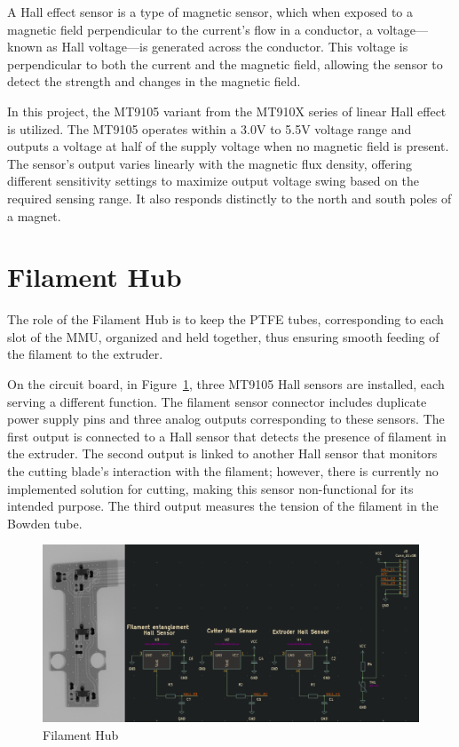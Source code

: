 A Hall effect sensor is a type of magnetic sensor, which when exposed to a magnetic field perpendicular to the current's flow in a conductor, a voltage—known as Hall voltage—is generated across the conductor. This voltage is perpendicular to both the current and the magnetic field, allowing the sensor to detect the strength and changes in the magnetic field.

In this project, the MT9105 variant \cite{hall-effect-sensor} from the MT910X series of linear Hall effect is utilized. The MT9105 operates within a 3.0V to 5.5V voltage range and outputs a voltage at half of the supply voltage when no magnetic field is present. The sensor's output varies linearly with the magnetic flux density, offering different sensitivity settings to maximize output voltage swing based on the required sensing range. It also responds distinctly to the north and south poles of a magnet.

\section{Filament Hub}

The role of the Filament Hub is to keep the PTFE tubes, corresponding to each slot of the MMU, organized and held together, thus ensuring smooth feeding of the filament to the extruder.

On the circuit board, in Figure~\ref{fig:hub_ic}, three MT9105 Hall sensors are installed, each serving a different function. The filament sensor connector includes duplicate power supply pins and three analog outputs corresponding to these sensors. The first output is connected to a Hall sensor that detects the presence of filament in the extruder. The second output is linked to another Hall sensor that monitors the cutting blade's interaction with the filament; however, there is currently no implemented solution for cutting, making this sensor non-functional for its intended purpose. The third output measures the tension of the filament in the Bowden tube.

\begin{figure}[H]
    \centering
    \includegraphics[width=0.8\linewidth]{img/filament_hub}
    \caption{Filament Hub}
    \label{fig:hub_ic} 
\end{figure}


